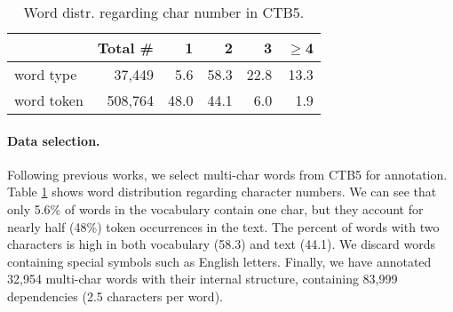 \setlength{\tabcolsep}{3pt}
\begin{table}[tb]
\begin{center}
\newcommand{\tabincell}[2]{\begin{tabular}{@{}#1@{}}#2\end{tabular}}
\begin{tabular}{l |r | r  r  r   r }
    \toprule
     & Total \# & 1 & 2 &  3 & $\ge$4 \\
    \hline
    word type & 37,449 &  5.6 & 58.3 & 22.8 & 13.3 \\
    word token & 508,764 & 48.0  & 44.1 & 6.0 & 1.9 \\
    \bottomrule
\end{tabular}
\end{center}
\caption{{Word distr. regarding char number in CTB5. }}\label{tbl:summary-different-num-word}
\end{table}


\paragraph{Data selection.}  


Following previous works, we select multi-char words from CTB5 for annotation. 
Table \ref{tbl:summary-different-num-word} shows word distribution  regarding character numbers. 
We can see that only 5.6\% of words in the vocabulary contain one char, but they account for nearly half (48\%) token occurrences in the text. 
The percent of words with two characters is high in both vocabulary (58.3) and text (44.1). 
We discard words containing special symbols such as English letters. Finally, we have annotated 32,954 multi-char words with their internal structure, containing 83,999 dependencies (2.5 characters per word).

